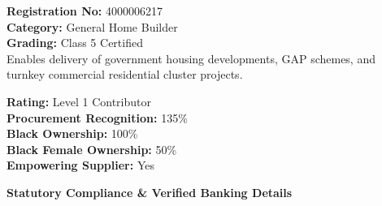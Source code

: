 \documentclass[a4paper,11pt]{article}
\providecommand{\faAward}{\faCertificate}
\begin{document}
\hfill
\begin{minipage}[t]{0.34\textwidth}
    \begin{tcolorbox}[
        enhanced, colback=white, colframe=mhlightgray, boxrule=0.8pt, arc=4pt,
        title={\bfseries\color{white}\faBuilding\ NHBRC Registration},
        colbacktitle=mhnavy, fonttitle=\bfseries\small,
        left=7pt, right=7pt, top=6pt, bottom=6pt,
        drop shadow=black!4
    ]
        {\fontsize{7.8pt}{10.8pt}\selectfont\color{mhtext}
        \textbf{Registration No:} 4000006217\\
        \textbf{Category:} General Home Builder\\
        \textbf{Grading:} Class 5 Certified\\
        Enables delivery of government housing developments, GAP schemes, and turnkey commercial residential cluster projects.
        }
    \end{tcolorbox}

    \vspace{0.20cm}

    \begin{tcolorbox}[
        enhanced, colback=mhoffwhite, colframe=mhnavy, boxrule=0.8pt, arc=4pt,
        title={\bfseries\color{white}\faAward\ B-BBEE Credentials},
        colbacktitle=mhnavy, fonttitle=\bfseries\small,
        left=7pt, right=7pt, top=6pt, bottom=6pt,
        drop shadow=black!4
    ]
        {\fontsize{7.8pt}{10.8pt}\selectfont\color{mhtext}
        \textbf{Rating:} Level 1 Contributor\\
        \textbf{Procurement Recognition:} 135\%\\
        \textbf{Black Ownership:} 100\%\\
        \textbf{Black Female Ownership:} 50\%\\
        \textbf{Empowering Supplier:} Yes
        }
    \end{tcolorbox}
\end{minipage}

\vfill

{\large\bfseries\color{mhnavy} Statutory Compliance \& Verified Banking Details}
\vspace{0.08cm}
\end{document}
